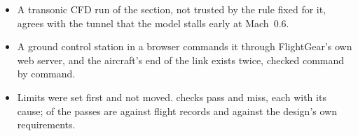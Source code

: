 \documentclass[10pt,a4paper,twocolumn]{article}
\begin{document}
\begin{itemize}
buy margin to the angle-of-attack limit and cost sink and runway (Boeing's also the assumed structural limits), with no gain in the hard landings that can be shown (336 flights an arm, $\pm6$ points, flown twice). The low wing's tips limit the bank at touchdown: a stiffer roll loop with the bank washed out takes the rigid tip contacts
of 216 unseen flights from 48 to none and the line at the wheels from 14.6 to 5.5\,ft; with the model's estimated bending the tips still reach the ground in about a third, more at a full weight. In a steady crosswind in FlightGear the flare drifts the aircraft $0.0076$\,ft per knot
per 1\,000\,lb downwind, and an aim offset of that size lands the first wheel within 2\,ft of the line.
\item A transonic CFD run of the section, not trusted by the rule fixed for it, agrees with the tunnel that the model stalls early at Mach~0.6.
\item A ground control station in a browser commands it through FlightGear's own web server, and the aircraft's end of the link exists twice, checked
command by command.
\item Limits were set first and not moved. \Npass{} checks pass and \Nmiss{} miss, each with its cause; \NFpass{} of the passes are against flight
records and \NDpass{} against the design's own requirements.
\end{itemize}
\end{document}
